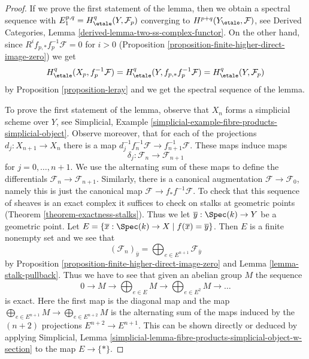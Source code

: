 \begin{proof}
If we prove the first statement of the lemma, then we obtain a spectral
sequence with $E_1^{p, q} = H^q_\etale(Y, \mathcal{F}_p)$ converging
to $H^{p + q}(Y_\etale, \mathcal{F})$, see
Derived Categories, Lemma \ref{derived-lemma-two-ss-complex-functor}.
On the other hand, since
$R^if_{p, *}f_p^{-1}\mathcal{F} = 0$ for $i > 0$
(Proposition \ref{proposition-finite-higher-direct-image-zero})
we get
$$
H^q_\etale(X_p, f_p^{-1}\mathcal{F}) =
H^q_\etale(Y, f_{p, *}f_p^{-1} \mathcal{F}) =
H^q_\etale(Y, \mathcal{F}_p)
$$
by Proposition \ref{proposition-leray}
and we get the spectral sequence of the lemma.

\medskip\noindent
To prove the first statement of the lemma, observe that
$X_n$ forms a simplicial scheme over $Y$, see
Simplicial, Example \ref{simplicial-example-fibre-products-simplicial-object}.
Observe moreover, that for each of the projections
$d_j : X_{n + 1} \to X_n$ there is a map
$d_j^{-1} f_n^{-1}\mathcal{F} \to f_{n + 1}^{-1}\mathcal{F}$.
These maps induce maps
$$
\delta_j : \mathcal{F}_n \to \mathcal{F}_{n + 1}
$$
for $j = 0, \ldots, n + 1$. We use the alternating sum of these maps
to define the differentials $\mathcal{F}_n \to \mathcal{F}_{n + 1}$.
Similarly, there is a canonical augmentation $\mathcal{F} \to \mathcal{F}_0$,
namely this is just the canonical map $\mathcal{F} \to f_*f^{-1}\mathcal{F}$.
To check that this sequence of sheaves is an exact complex it suffices
to check on stalks at geometric points (Theorem \ref{theorem-exactness-stalks}).
Thus we let $\overline{y} : \Spec(k) \to Y$ be a geometric point. Let
$E = \{\overline{x} : \Spec(k) \to X \mid f(\overline{x}) = \overline{y}\}$.
Then $E$ is a finite nonempty set and we see that
$$
(\mathcal{F}_n)_{\overline{y}} =
\bigoplus\nolimits_{e \in E^{n + 1}} \mathcal{F}_{\overline{y}}
$$
by Proposition \ref{proposition-finite-higher-direct-image-zero}
and Lemma \ref{lemma-stalk-pullback}.
Thus we have to see that given an abelian group $M$ the sequence
$$
0 \to M \to \bigoplus\nolimits_{e \in E} M \to
\bigoplus\nolimits_{e \in E^2} M \to \ldots
$$
is exact. Here the first map is the diagonal map and the map
$\bigoplus_{e \in E^{n + 1}} M  \to \bigoplus_{e \in E^{n + 2}} M$
is the alternating sum of the maps induced by the $(n + 2)$
projections $E^{n + 2} \to E^{n + 1}$. This can be shown directly
or deduced by applying Simplicial, Lemma
\ref{simplicial-lemma-fibre-products-simplicial-object-w-section}
to the map $E \to \{*\}$.
\end{proof}

